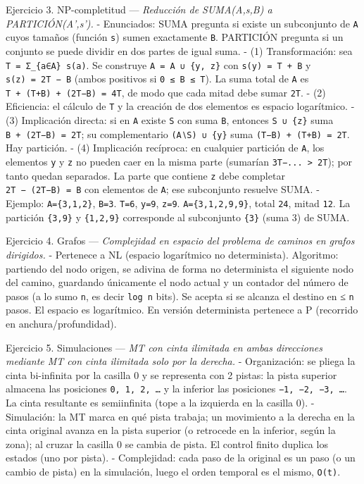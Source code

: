 \documentclass[12pt]{book} %
\begin{document}
Ejercicio 3. NP-completitud --- \emph{Reducción de SUMA(A,s,B) a
PARTICIÓN(A',s').} - Enunciados: SUMA pregunta si existe un subconjunto
de \texttt{A} cuyos tamaños (función \texttt{s}) sumen exactamente
\texttt{B}. PARTICIÓN pregunta si un conjunto se puede dividir en dos
partes de igual suma. - (1) Transformación: sea
\texttt{T\ =\ Σ\_\{a∈A\}\ s(a)}. Se construye
\texttt{A\textquotesingle{}\ =\ A\ ∪\ \{y,\ z\}} con
\texttt{s\textquotesingle{}(y)\ =\ T\ +\ B} y
\texttt{s\textquotesingle{}(z)\ =\ 2T\ −\ B} (ambos positivos si
\texttt{0\ ≤\ B\ ≤\ T}). La suma total de \texttt{A\textquotesingle{}}
es \texttt{T\ +\ (T+B)\ +\ (2T−B)\ =\ 4T}, de modo que cada mitad debe
sumar \texttt{2T}. - (2) Eficiencia: el cálculo de \texttt{T} y la
creación de dos elementos es espacio logarítmico. - (3) Implicación
directa: si en \texttt{A} existe \texttt{S} con suma \texttt{B},
entonces \texttt{S\ ∪\ \{z\}} suma \texttt{B\ +\ (2T−B)\ =\ 2T}; su
complementario \texttt{(A∖S)\ ∪\ \{y\}} suma
\texttt{(T−B)\ +\ (T+B)\ =\ 2T}. Hay partición. - (4) Implicación
recíproca: en cualquier partición de \texttt{A\textquotesingle{}}, los
elementos \texttt{y} y \texttt{z} no pueden caer en la misma parte
(sumarían \texttt{3T−...\ \textgreater{}\ 2T}); por tanto quedan
separados. La parte que contiene \texttt{z} debe completar
\texttt{2T\ −\ (2T−B)\ =\ B} con elementos de \texttt{A}; ese
subconjunto resuelve SUMA. - Ejemplo: \texttt{A=\{3,1,2\}},
\texttt{B=3}. \texttt{T=6}, \texttt{y=9}, \texttt{z=9}.
\texttt{A\textquotesingle{}=\{3,1,2,9,9\}}, total \texttt{24}, mitad
\texttt{12}. La partición \texttt{\{3,9\}} y \texttt{\{1,2,9\}}
corresponde al subconjunto \texttt{\{3\}} (suma 3) de SUMA.

Ejercicio 4. Grafos --- \emph{Complejidad en espacio del problema de
caminos en grafos dirigidos.} - Pertenece a NL (espacio logarítmico no
determinista). Algoritmo: partiendo del nodo origen, se adivina de forma
no determinista el siguiente nodo del camino, guardando únicamente el
nodo actual y un contador del número de pasos (a lo sumo \texttt{n}, es
decir \texttt{log\ n} bits). Se acepta si se alcanza el destino en ≤
\texttt{n} pasos. El espacio es logarítmico. En versión determinista
pertenece a P (recorrido en anchura/profundidad).

Ejercicio 5. Simulaciones --- \emph{MT con cinta ilimitada en ambas
direcciones mediante MT con cinta ilimitada solo por la derecha.} -
Organización: se pliega la cinta bi-infinita por la casilla 0 y se
representa con 2 pistas: la pista superior almacena las posiciones
\texttt{0,\ 1,\ 2,\ …} y la inferior las posiciones
\texttt{−1,\ −2,\ −3,\ …}. La cinta resultante es semiinfinita (tope a
la izquierda en la casilla 0). - Simulación: la MT marca en qué pista
trabaja; un movimiento a la derecha en la cinta original avanza en la
pista superior (o retrocede en la inferior, según la zona); al cruzar la
casilla 0 se cambia de pista. El control finito duplica los estados (uno
por pista). - Complejidad: cada paso de la original es un paso (o un
cambio de pista) en la simulación, luego el orden temporal es el mismo,
\texttt{O(t)}.
\end{document}
